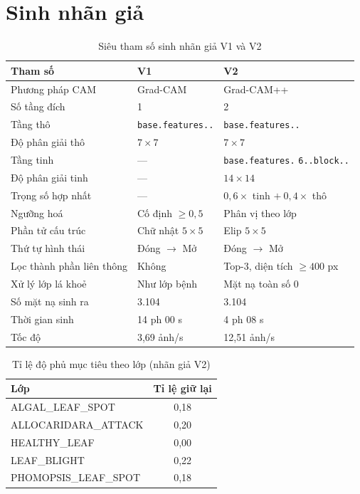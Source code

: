 \section{Sinh nhãn giả}

\begin{table}[H]
\centering
\caption{Siêu tham số sinh nhãn giả V1 và V2}
\label{tab:app_pseudo}
\begin{tabular}{L{4.4cm} L{4.2cm} L{4.4cm}}
\toprule
\textbf{Tham số} & \textbf{V1} & \textbf{V2} \\
\midrule
Phương pháp CAM   & Grad-CAM & Grad-CAM++ \\
Số tầng đích      & 1 & 2 \\
Tầng thô          & \texttt{base.\allowbreak features..} & \texttt{base.\allowbreak features..} \\
Độ phân giải thô  & $7 \times 7$ & $7 \times 7$ \\
Tầng tinh         & --- & \texttt{base.\allowbreak features.} \texttt{6..\allowbreak block..} \\
Độ phân giải tinh & --- & $14 \times 14$ \\
Trọng số hợp nhất & --- & $0{,}6 \times$ tinh $+\ 0{,}4 \times$ thô \\
Ngưỡng hoá        & Cố định $\geq 0{,}5$ & Phân vị theo lớp \\
Phần tử cấu trúc  & Chữ nhật $5 \times 5$ & Elip $5 \times 5$ \\
Thứ tự hình thái  & Đóng $\rightarrow$ Mở & Đóng $\rightarrow$ Mở \\
Lọc thành phần liên thông & Không & Top-3, diện tích $\geq 400$ px \\
Xử lý lớp lá khoẻ & Như lớp bệnh & Mặt nạ toàn số 0 \\
Số mặt nạ sinh ra & 3.104 & 3.104 \\
Thời gian sinh    & 14 ph 00 s & 4 ph 08 s \\
Tốc độ            & 3,69 ảnh/s & 12,51 ảnh/s \\
\bottomrule
\end{tabular}
\end{table}

\begin{table}[H]
\centering
\caption{Tỉ lệ độ phủ mục tiêu theo lớp (nhãn giả V2)}
\label{tab:app_keeppct}
\begin{tabular}{l c}
\toprule
\textbf{Lớp} & \textbf{Tỉ lệ giữ lại} \\
\midrule
ALGAL\_LEAF\_SPOT      & 0,18 \\
ALLOCARIDARA\_ATTACK   & 0,20 \\
HEALTHY\_LEAF          & 0,00 \\
LEAF\_BLIGHT           & 0,22 \\
PHOMOPSIS\_LEAF\_SPOT  & 0,18 \\
\bottomrule
\end{tabular}
\end{table}

